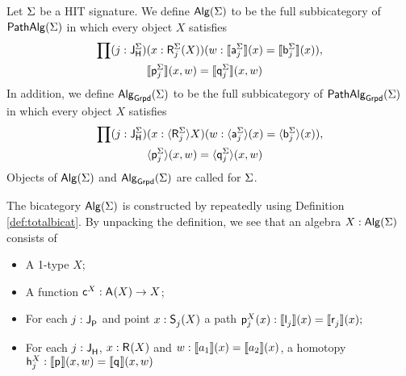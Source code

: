 \begin{definition}
\label{def:bicat_grpd}
Let $\sign$ be a HIT signature.
We define $\algM(\sign)$ to be the full subbicategory of $\pathalgM(\sign)$
in which every object $X$ satisfies
\begin{equation*}
\begin{split}
\prod
(j : \homotlabel[\sign]) &(x : \polyAct{\homotpointarg[\sign]_j}{X}) (w : \semE{\pathargleft[\sign]_j}(x) = \semE{\pathargright[\sign]_j}(x)),\\
&\semH{\homotleft[\sign]_j}(x, w) = \semH{\homotright[\sign]_j}(x, w)
\end{split}
\end{equation*}
In addition, we define $\algG{\sign}$ to be the full subbicategory of $\pathalgG{\sign} $
in which every object $X$ satisfies
\begin{equation*}
\begin{split}
\prod
(j : \homotlabel[\sign]) &(x : \semPG{\homotpointarg[\sign]_j}{X}) (w : \semEG{\pathargleft[\sign]_j}(x) = \semEG{\pathargright[\sign]_j}(x)),\\
&\semHG{\homotleft[\sign]_j}(x, w) = \semHG{\homotright[\sign]_j}(x, w)
\end{split}
\end{equation*}
Objects of $\algM(\sign)$ and $\algG{\sign}$ are called  for $\sign$.
\end{definition}

The bicategory $\algM(\sign)$ is constructed by repeatedly using Definition \ref{def:totalbicat}.
By unpacking the definition, we see that an algebra $X : \algM(\sign)$ consists of
\begin{itemize}
	\item A 1-type $X$;
	\item A function $\AlgPoint{X} : \polyAct{\pointconstr}{X} \rightarrow X$;
	\item For each $j : \pathlabel$ and point $x : \polyAct{\patharg_j}{X}$ a path
	$
	\AlgPath{X}{j}(x) : \semE{\pathleft_j}(x) = \semE{\pathright_j}(x);
	$
	\item For each $j : \homotlabel$, $x : \polyAct{\homotpointarg}{X}$ and $w : \semE{a_1}(x) = \semE{a_2}(x)$, a homotopy
	$
	\AlgHomot{X}{j} : \semH{\homotleft}(x, w) = \semH{\homotright}(x, w)
	$
\end{itemize}